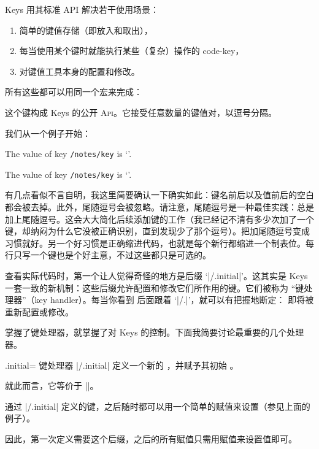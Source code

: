 \documentclass[a4paper,doc2]{ltxdoc}
\def\API{\textsc{Api}}%
\begin{document}
\PGF Keys 用其标准 API 解决若干使用场景：
\begin{enumerate}
	\item 简单的键值存储（即放入和取出），
	\item 每当使用某个键时就能执行某些（复杂）操作的 code-key，
	\item 对键值工具本身的配置和修改。
\end{enumerate}
所有这些都可以用同一个宏来完成：

\begin{command}{\pgfkeys{}}
	这个键构成 \PGF Keys 的公开 \API。它接受任意数量的键值对，以逗号分隔。
\end{command}

我们从一个例子开始：
\begin{codeexample}[]

The value of key \texttt{/notes/key} is `'.


The value of key \texttt{/notes/key} is `'.
\end{codeexample}

有几点看似不言自明，我这里简要确认一下确实如此：键名前后以及值前后的空白都会被去掉。此外，尾随逗号会被忽略。请注意，尾随逗号是一种最佳实践：总是加上尾随逗号。这会大大简化后续添加键的工作（我已经记不清有多少次加了一个键，却纳闷为什么它没被正确识别，直到发现少了那个逗号）。把加尾随逗号变成习惯就好。另一个好习惯是正确缩进代码，也就是每个新行都缩进一个制表位。每行只写一个键也是个好主意，不过这些都只是可选的。

查看实际代码时，第一个让人觉得奇怪的地方是后缀 `|/.initial|'。这其实是 \PGF Keys 一套一致的新机制：这些后缀允许配置和修改它们所作用的键。它们被称为 ``键处理器''（key handler）。每当你看到  后面跟着 `|/.|'，就可以有把握地断定： 即将被重新配置或修改。

掌握了键处理器，就掌握了对 \PGF Keys 的控制。下面我简要讨论最重要的几个处理器。

\begin{handler}{{.initial}=}
	键处理器 |/.initial| 定义一个新的 ，并赋予其初始 。

	就此而言，它等价于 |\pgfkeyssetvalue|。

	通过 |/.initial| 定义的键，之后随时都可以用一个简单的赋值来设置（参见上面的例子）。

	因此，第一次定义需要这个后缀，之后的所有赋值只需用赋值来设置值即可。
\end{handler}
\end{document}
